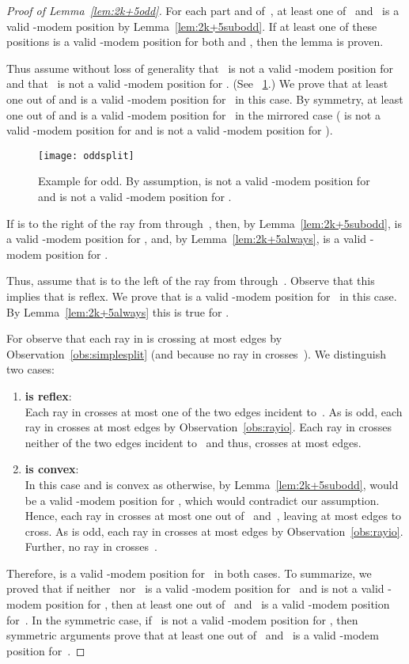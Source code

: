 \documentclass[A4]{article}
\begin{document}
\begin{proof}[Proof of Lemma~\ref{lem:2k+5odd}]
For each part  and  of~, at least one of~ and~ is a valid \mbox{-modem} position by Lemma~\ref{lem:2k+5subodd}.
If at least one of these positions is a valid \mbox{-modem} position for both  and , then the lemma is proven.

Thus assume without loss of generality that~ is not a valid \mbox{-modem} position for  and that~ is not a valid \mbox{-modem} position for .
(See \figurename~\ref{fig:oddsplit}.) 
We prove that at least one out of  and  is a valid \mbox{-modem} position for~ in this case.
By symmetry, at least one out of  and  is a valid \mbox{-modem} position for~ in the mirrored case ( is not a valid \mbox{-modem} position for  and  is not a valid \mbox{-modem} position for ).


\begin{figure}[htb]
  \centering
  \texttt{[image: oddsplit]}
  \caption{Example for  odd. By assumption,  is not a valid \mbox{-modem} position for  and  is not a valid \mbox{-modem} position for .}
  \label{fig:oddsplit}
\end{figure}


If  is to the right of the ray from  through~, then, by Lemma~\ref{lem:2k+5subodd},  is a valid \mbox{-modem} position for , and, by Lemma~\ref{lem:2k+5always},  is a valid \mbox{-modem} position for .

Thus, assume that  is to the left of the ray from  through~.
Observe that this implies that  is reflex.
We prove that  is a valid \mbox{-modem} position for~ in this case.
By Lemma~\ref{lem:2k+5always} this is true for .

For  observe that each ray in  is crossing at most  edges by Observation~\ref{obs:simplesplit} (and because no ray in  crosses~).
We distinguish two cases:
\begin{enumerate}
\item \textbf{ is reflex}:\\
Each ray in  crosses at most one of the two edges incident to~.
As  is odd, each ray in  crosses at most  edges by Observation~\ref{obs:rayio}.
Each ray in  crosses neither of the two edges incident to~ and thus, crosses at most  edges.
\item \textbf{ is convex}:\\
In this case  and  is convex as otherwise, by Lemma~\ref{lem:2k+5subodd},  would be a valid \mbox{-modem} position for , which would contradict our assumption.
Hence, each ray in  crosses at most one out of~ and~, leaving at most  edges to cross.
As  is odd, each ray in  crosses at most  edges by Observation~\ref{obs:rayio}.
Further, no ray in  crosses~.
\end{enumerate}
Therefore,  is a valid \mbox{-modem} position for~ in both cases.
To summarize, we proved that if neither~ nor~ is a valid \mbox{-modem} position for~ and  is not a valid \mbox{-modem} position for , then at least one out of~ and~ is a valid \mbox{-modem} position for~. 
In the symmetric case, if~ is not a valid \mbox{-modem} position for , then symmetric arguments prove that at least one out of~ and~ is a valid \mbox{-modem} position for~.
\end{proof}
\end{document}
